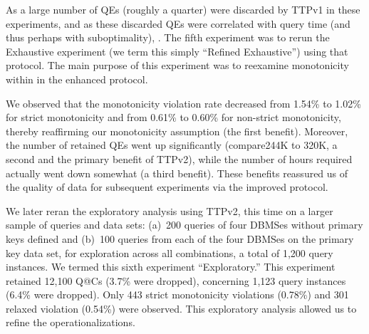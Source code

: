 \documentclass[prodmode,acmtods]{acmsmall}
\makeatletter
\def\QatC{Q{@}C}
\makeatother
\begin{document}
As a large number of QEs (roughly a quarter) were discarded by TTPv1 in
these experiments, and as these discarded QEs were correlated with query
time (and thus perhaps with suboptimality),
.
The fifth experiment was to rerun the Exhaustive experiment  (we term this simply
``Refined Exhaustive'') using that protocol. The main purpose of this experiment 
was to reexamine monotonicity within in the enhanced
protocol.

We observed that the monotonicity violation rate decreased
from 1.54\% to 1.02\% for strict monotonicity and from 0.61\% to 0.60\% for
non-strict monotonicity, thereby reaffirming our monotonicity assumption
(the first benefit). Moreover, the number of retained QEs went up
significantly (compare244K to 320K, a second and the primary benefit of TTPv2), 
while the number of hours required actually went down somewhat (a third benefit).
These benefits reassured us of the quality of data 
for subsequent experiments via the improved protocol.

We later reran the exploratory analysis using TTPv2, this time on a larger sample of queries and data sets:
(a)~200 queries of four \hbox{DBMSes} without primary keys defined and
(b)~100 queries from each of the four \hbox{DBMSes} on the primary key data set,
for exploration across all combinations, a total of 1,200 query instances. %
We termed this sixth experiment ``Exploratory.'' This experiment 
retained 12,100 {\QatC}s (3.7\% were dropped), concerning 1,123 query
instances (6.4\% were dropped). Only 443 strict monotonicity violations (0.78\%) and 301 relaxed
violation (0.54\%) were observed. This exploratory analysis allowed us to refine
the operationalizations.
\end{document}
